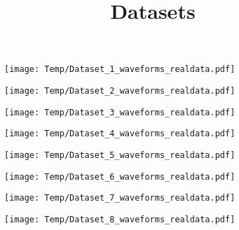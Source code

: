 \documentclass[14pt,a4paper]{extarticle}
\title{Datasets}
\author{}
\date{}
\begin{document}
\begin{figure}
\centering
\texttt{[image: Temp/Dataset\_1\_waveforms\_realdata.pdf]}
\end{figure}

\begin{figure}
\centering
\texttt{[image: Temp/Dataset\_2\_waveforms\_realdata.pdf]}
\end{figure}

\begin{figure}
\centering
\texttt{[image: Temp/Dataset\_3\_waveforms\_realdata.pdf]}
\end{figure}

\begin{figure}
\centering
\texttt{[image: Temp/Dataset\_4\_waveforms\_realdata.pdf]}
\end{figure}

\begin{figure}
\centering
\texttt{[image: Temp/Dataset\_5\_waveforms\_realdata.pdf]}
\end{figure}

\begin{figure}
\centering
\texttt{[image: Temp/Dataset\_6\_waveforms\_realdata.pdf]}
\end{figure}

\begin{figure}
\centering
\texttt{[image: Temp/Dataset\_7\_waveforms\_realdata.pdf]}
\end{figure}

\begin{figure}
\centering
\texttt{[image: Temp/Dataset\_8\_waveforms\_realdata.pdf]}
\end{figure}
\end{document}
